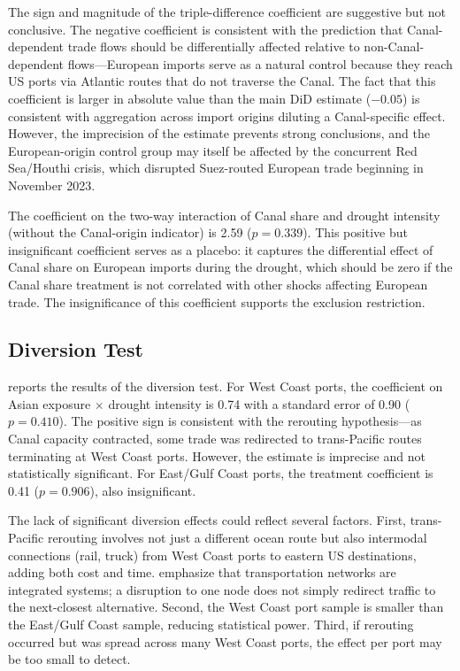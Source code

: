 \documentclass[12pt]{article}
\begin{document}
The sign and magnitude of the triple-difference coefficient are suggestive but not conclusive. The negative coefficient is consistent with the prediction that Canal-dependent trade flows should be differentially affected relative to non-Canal-dependent flows---European imports serve as a natural control because they reach US ports via Atlantic routes that do not traverse the Canal. The fact that this coefficient is larger in absolute value than the main DiD estimate ($-0.05$) is consistent with aggregation across import origins diluting a Canal-specific effect. However, the imprecision of the estimate prevents strong conclusions, and the European-origin control group may itself be affected by the concurrent Red Sea/Houthi crisis, which disrupted Suez-routed European trade beginning in November 2023.

The coefficient on the two-way interaction of Canal share and drought intensity (without the Canal-origin indicator) is 2.59 ($p = 0.339$). This positive but insignificant coefficient serves as a placebo: it captures the differential effect of Canal share on European imports during the drought, which should be zero if the Canal share treatment is not correlated with other shocks affecting European trade. The insignificance of this coefficient supports the exclusion restriction.




\subsection{Diversion Test}

 reports the results of the diversion test. For West Coast ports, the coefficient on Asian exposure $\times$ drought intensity is 0.74 with a standard error of 0.90 ($p = 0.410$). The positive sign is consistent with the rerouting hypothesis---as Canal capacity contracted, some trade was redirected to trans-Pacific routes terminating at West Coast ports. However, the estimate is imprecise and not statistically significant. For East/Gulf Coast ports, the treatment coefficient is 0.41 ($p = 0.906$), also insignificant.

The lack of significant diversion effects could reflect several factors. First, trans-Pacific rerouting involves not just a different ocean route but also intermodal connections (rail, truck) from West Coast ports to eastern US destinations, adding both cost and time. \citet{redding2015transportation} emphasize that transportation networks are integrated systems; a disruption to one node does not simply redirect traffic to the next-closest alternative. Second, the West Coast port sample is smaller than the East/Gulf Coast sample, reducing statistical power. Third, if rerouting occurred but was spread across many West Coast ports, the effect per port may be too small to detect.
\end{document}
